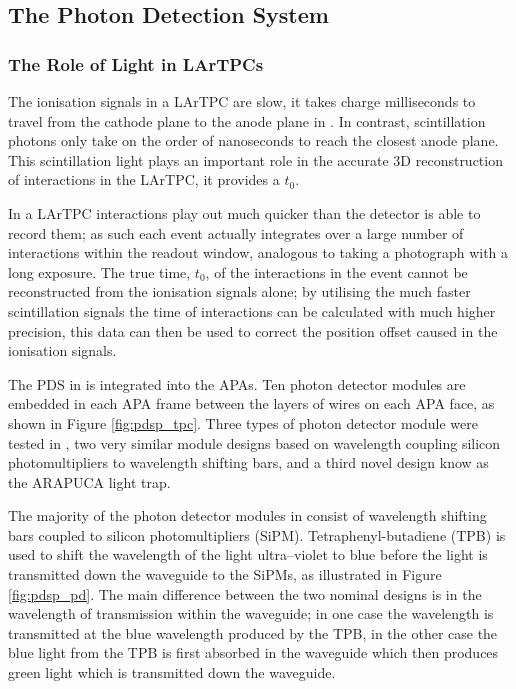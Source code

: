 \subsection{The Photon Detection System}

\subsubsection*{The Role of Light in LArTPCs}

The ionisation signals in a LArTPC are slow, it takes charge milliseconds to
travel from the cathode plane to the anode plane in \protodune{}. In contrast,
scintillation photons only take on the order of nanoseconds to reach the closest
anode plane. This scintillation light plays an important role in the accurate 3D
reconstruction of interactions in the LArTPC, it provides a $t_0$. 

In a LArTPC interactions play out much quicker than the detector is able to 
record them; as such each event actually integrates over a large number of
interactions within the readout window, analogous to taking a photograph with a 
long exposure. The true time, $t_0$, of the interactions in the event cannot be 
reconstructed from the ionisation signals alone; by utilising the much faster 
scintillation signals the time of interactions can be calculated with much 
higher precision, this data can then be used to correct the position offset
caused in the ionisation signals.

\bigskip

The PDS in \protodune{} is integrated into the APAs. Ten photon detector modules
 are embedded in each APA frame between the layers of wires on each APA 
face, as shown in Figure \ref{fig:pdsp_tpc}. Three types of photon detector
module were tested in \protodune{}, two very similar module designs based on
wavelength coupling silicon photomultipliers to wavelength shifting bars, and a
third novel design know as the ARAPUCA light trap.

The majority of the photon detector modules in \protodune{}  consist of 
wavelength shifting bars coupled to silicon photomultipliers (SiPM). 
Tetraphenyl-butadiene (TPB) is used to shift the wavelength of the light 
ultra--violet to blue before the light is transmitted down the waveguide to 
the SiPMs, as illustrated in Figure \ref{fig:pdsp_pd}. The main difference 
between the two nominal designs is in the wavelength of transmission within the 
waveguide; in one case the wavelength is transmitted at the blue wavelength
produced by the TPB, in the other case the blue light from the TPB is first
absorbed in the waveguide which then produces green light which is transmitted
down the waveguide.

